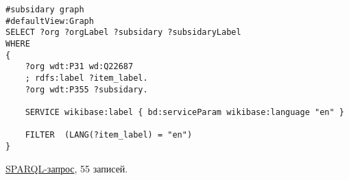 \begin{lstlisting}[language=SPARQL,label=suborgs2,caption=Построение графа родительских и дочерных организаций без висячих вершин]
#subsidary graph
#defaultView:Graph
SELECT ?org ?orgLabel ?subsidary ?subsidaryLabel
WHERE
{
    ?org wdt:P31 wd:Q22687
    ; rdfs:label ?item_label.
    ?org wdt:P355 ?subsidary. 
  
    SERVICE wikibase:label { bd:serviceParam wikibase:language "en" }

    FILTER  (LANG(?item_label) = "en") 
}
\end{lstlisting}

\href{https://query.wikidata.org/#%23neighboring%20countries%20graph%0A%23defaultView%3AGraph%0ASELECT%20%3Forg%20%3ForgLabel%20%3Fsubsidary%20%3FsubsidaryLabel%0AWHERE%0A%7B%0A%20%20%20%20%3Forg%20wdt%3AP31%20wd%3AQ22687%0A%20%20%20%20%3B%20rdfs%3Alabel%20%3Fitem_label%20.%0A%20%20%20%20%3Forg%20wdt%3AP355%20%3Fsubsidary%20.%20%0A%20%20%0A%20%20%20%20SERVICE%20wikibase%3Alabel%20%7B%20bd%3AserviceParam%20wikibase%3Alanguage%20%22en%22%20%7D%0A%0A%20%20%20%20FILTER%20%20%28LANG%28%3Fitem_label%29%20%3D%20%22en%22%29%20%0A%7D%0A}{SPARQL-запрос}, 55 записей.
